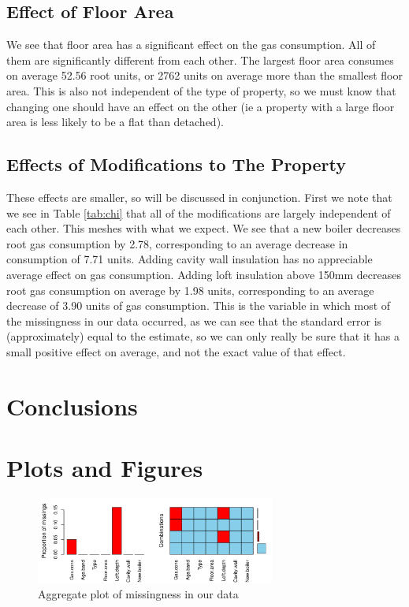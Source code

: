 \documentclass[9pt]{extarticle}
\begin{document}
\subsection{Effect of Floor Area}
We see that floor area has a significant effect on the gas consumption. All of them are significantly different from each other. The largest floor area consumes on average 52.56 root units, or 2762 units on average more than the smallest floor area. This is also not independent of the type of property, so we must know that changing one should have an effect on the other (ie a property with a large floor area is less likely to be a flat than detached).

\subsection{Effects of Modifications to The Property}
These effects are smaller, so will be discussed in conjunction. First we note that we see in Table \ref{tab:chi} that all of the modifications are largely independent of each other. This meshes with what we expect. We see that a new boiler decreases root gas consumption by 2.78, corresponding to an average decrease in consumption of 7.71 units. Adding cavity wall insulation has no appreciable average effect on gas consumption. Adding loft insulation above 150mm decreases root gas consumption on average by 1.98 units, corresponding to an average decrease of 3.90 units of gas consumption. This is the variable in which most of the missingness in our data occurred, as we can see that the standard error is (approximately) equal to the estimate, so we can only really be sure that it has a small positive effect on average, and not the exact value of that effect.


\section{Conclusions}

%

\appendix

\section{Plots and Figures}

\begin{figure}[H]
	\centering
	\includegraphics[width=0.7\textwidth]{aggr_missplot}
	\caption{Aggregate plot of missingness in our data}
	\label{fig:aggrmiss}
\end{figure}
\end{document}
